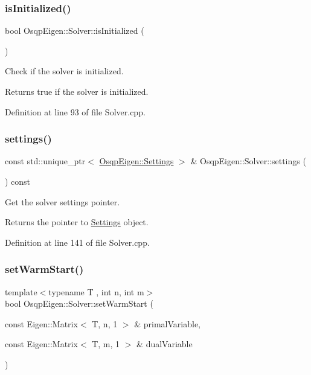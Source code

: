 \subsubsection{\texorpdfstring{is\+Initialized()}{isInitialized()}}
{\footnotesize\ttfamily bool Osqp\+Eigen\+::\+Solver\+::is\+Initialized (\begin{DoxyParamCaption}{ }\end{DoxyParamCaption})}



Check if the solver is initialized. 

\begin{DoxyReturn}{Returns}
true if the solver is initialized. 
\end{DoxyReturn}


Definition at line 93 of file Solver.\+cpp.

\mbox{\label{classOsqpEigen_1_1Solver_ad355be214417b0ccb1ec54913fe378c4}} 
\subsubsection{\texorpdfstring{settings()}{settings()}}
{\footnotesize\ttfamily const std\+::unique\+\_\+ptr$<$ \mbox{\hyperlink{classOsqpEigen_1_1Settings}{Osqp\+Eigen\+::\+Settings}} $>$ \& Osqp\+Eigen\+::\+Solver\+::settings (\begin{DoxyParamCaption}{ }\end{DoxyParamCaption}) const}



Get the solver settings pointer. 

\begin{DoxyReturn}{Returns}
the pointer to \mbox{\hyperlink{classOsqpEigen_1_1Settings}{Settings}} object. 
\end{DoxyReturn}


Definition at line 141 of file Solver.\+cpp.

\mbox{\label{classOsqpEigen_1_1Solver_a13f8e53aae03e483fa46066c7b93e066}} 
\subsubsection{\texorpdfstring{set\+Warm\+Start()}{setWarmStart()}}
{\footnotesize\ttfamily template$<$typename T , int n, int m$>$ \\
bool Osqp\+Eigen\+::\+Solver\+::set\+Warm\+Start (\begin{DoxyParamCaption}\item[{const Eigen\+::\+Matrix$<$ T, n, 1 $>$ \&}]{primal\+Variable,  }\item[{const Eigen\+::\+Matrix$<$ T, m, 1 $>$ \&}]{dual\+Variable }\end{DoxyParamCaption})}



